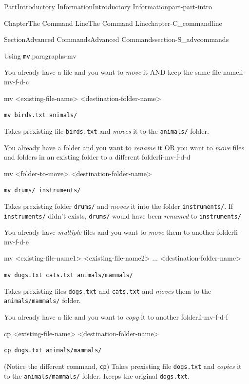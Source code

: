 \documentclass[twoside,10pt,]{book}
\newcommand{\mono}[1]{\texttt{#1}}
\begin{document}
\begin{partptx}{Part}{Introductory Information}{}{Introductory Information}{}{}{part-part-intro}
\begin{chapterptx}{Chapter}{The Command Line}{}{The Command Line}{}{}{chapter-C_commandline}
\begin{sectionptx}{Section}{Advanced Commands}{}{Advanced Commands}{}{}{section-S_advcommands}
\begin{paragraphs}{Using \mono{mv}.}{paragraphs-mv}
\begin{descriptionlist}
\begin{dlinarrow}{You already have a file and you want to \emph{move} it AND keep the same file name}{li-mv-f-d-c}
%
\begin{codedisplay}
mv <existing-file-name> <destination-folder-name>
\end{codedisplay}
%
\par
\mono{mv birds.txt animals/}%
\par
Takes prexisting file \mono{birds.txt} and \emph{moves} it to the \mono{animals/} folder.%
\end{dlinarrow}%
\begin{dlinarrow}{You already have a folder and you want to \emph{rename} it OR you want to \emph{move} files and folders in an existing folder to a different folder}{li-mv-f-d-d}%
%
\begin{codedisplay}
mv <folder-to-move> <destination-folder-name>
\end{codedisplay}
%
\par
\mono{mv drums/ instruments/}%
\par
Takes prexisting folder \mono{drums/} and \emph{moves} it into the folder \mono{instruments/}. If \mono{instruments/} didn't exists, \mono{drums/} would have been \emph{renamed} to \mono{instruments/}%
\end{dlinarrow}%
\begin{dlinarrow}{You already have \emph{multiple} files and you want to \emph{move} them to another folder}{li-mv-f-d-e}%
%
\begin{codedisplay}
mv <existing-file-name1> <existing-file-name2> ...
	<destination-folder-name>
\end{codedisplay}
%
\par
\mono{mv dogs.txt cats.txt animals/mammals/}%
\par
Takes prexisting files \mono{dogs.txt} and \mono{cats.txt} and \emph{moves} them to the \mono{animals/mammals/} folder.%
\end{dlinarrow}%
\begin{dlinarrow}{You already have a file and you want to \emph{copy} it to another folder}{li-mv-f-d-f}%
%
\begin{codedisplay}
cp <existing-file-name> <destination-folder-name>
\end{codedisplay}
%
\par
\mono{cp dogs.txt animals/mammals/}%
\par
(Notice the different command, \mono{cp}) Takes prexisting file \mono{dogs.txt} and \emph{copies} it to the \mono{animals/mammals/} folder. Keeps the original \mono{dogs.txt}.%
\end{dlinarrow}%
\end{descriptionlist}

\end{paragraphs}
\end{sectionptx}
\end{chapterptx}
\end{partptx}
\end{document}
